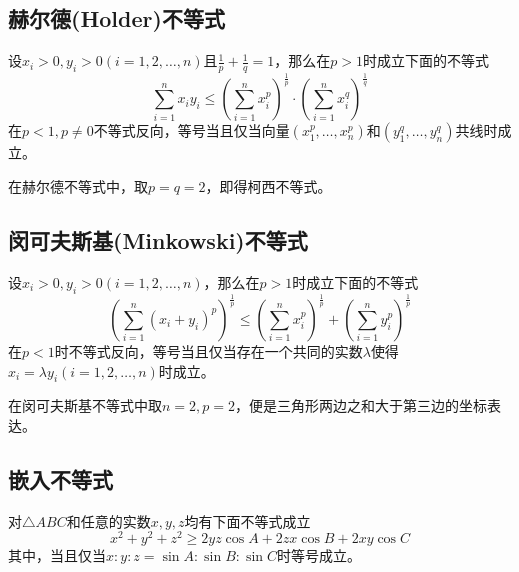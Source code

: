 \subsection{赫尔德(Holder)不等式}

\begin{theorem}[赫尔德不等式]
  设$x_i> 0, y_i> 0 (i=1,2,\ldots,n)$且$\frac{1}{p}+\frac{1}{q}=1$，那么在$p>1$时成立下面的不等式
  \begin{equation}
    \label{eq:holder-inequation}
    \sum_{i=1}^nx_iy_i \leqslant \left( \sum_{i=1}^nx_i^p \right)^{\frac{1}{p}} \cdot \left( \sum_{i=1}^nx_i^q \right)^{\frac{1}{q}}
  \end{equation}
  在$p<1,p\neq 0$不等式反向，等号当且仅当向量$(x_1^p,\ldots,x_n^p)$和$(y_1^q,\ldots,y_n^q)$共线时成立。
\end{theorem}
在赫尔德不等式中，取$p=q=2$，即得柯西不等式。

\subsection{闵可夫斯基(Minkowski)不等式}


\begin{theorem}[闵可夫斯基不等式]
  设$x_i>0, y_i>0 (i=1,2,\ldots,n)$，那么在$p>1$时成立下面的不等式
  \begin{equation}
    \label{eq:minkowski-inequation}
    \left( \sum_{i=1}^n(x_i+y_i)^p \right)^{\frac{1}{p}} \leqslant \left( \sum_{i=1}^nx_i^p \right)^{\frac{1}{p}} + \left( \sum_{i=1}^ny_i^p \right)^{\frac{1}{p}}
  \end{equation}
  在$p<1$时不等式反向，等号当且仅当存在一个共同的实数$\lambda$使得$x_i=\lambda y_i(i=1,2,\ldots,n)$时成立。
\end{theorem}
在闵可夫斯基不等式中取$n=2,p=2$，便是三角形两边之和大于第三边的坐标表达。

\subsection{嵌入不等式}

\begin{theorem}[嵌入不等式]
  对$\triangle ABC$和任意的实数$x,y,z$均有下面不等式成立
  \begin{equation}
    \label{eq:embedding-inequation}
    x^2+y^2+z^2 \geqslant 2yz\cos{A}+2zx\cos{B}+2xy\cos{C}
  \end{equation}
  其中，当且仅当$x:y:z = \sin{A} : \sin{B} : \sin{C}$时等号成立。
\end{theorem}

